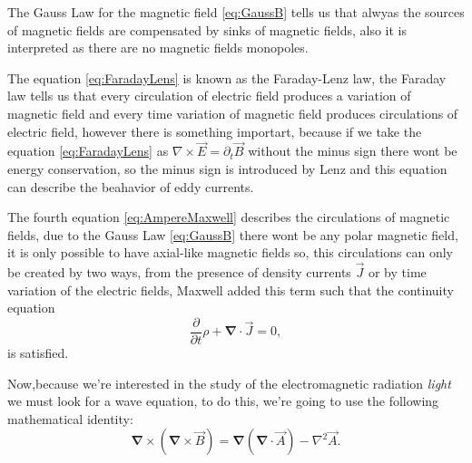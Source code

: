     The Gauss Law for the magnetic field \ref{eq:GaussB} tells us that alwyas the sources of magnetic fields are compensated by sinks of magnetic fields, also it is interpreted as there are no magnetic fields monopoles.

    The equation \ref{eq:FaradayLens} is known as the Faraday-Lenz law, the Faraday law tells us that every circulation of electric field produces a variation of magnetic field and every time variation of magnetic field produces circulations of electric field, however there is something importart, because if we take the equation \ref{eq:FaradayLens} as $\nabla \times \vec{E} = \partial_t \vec{B} $ without the minus sign there wont be energy conservation, so the minus sign is introduced by Lenz and this equation can describe the beahavior of eddy currents.

    The fourth equation \ref{eq:AmpereMaxwell} describes the circulations of magnetic fields, due to the Gauss Law \ref{eq:GaussB} there wont be any polar magnetic field, it is only possible to have axial-like magnetic fields so, this circulations can only be created by two ways, from the presence of density currents $\vec{J}$ or by time variation of the electric fields, Maxwell added this term such that the continuity equation
    \begin{equation}
        \frac{\partial}{\partial t}\rho + \bm{\nabla}\cdot \vec{J} = 0,
    \end{equation}
    is satisfied.
    

    Now,because we're interested in the study of the electromagnetic radiation \textit{light} we must look for a wave equation, to do this, we're going to use the following mathematical identity:
    \begin{equation}\label{eq:TripleCurl}
        \bm{\nabla}\times \left(\bm{\nabla} \times \vec{B} \right) =  \bm{\nabla} \left(\bm{\nabla} \cdot \vec{A}\right) - \nabla^2 \vec{A}.
    \end{equation}

